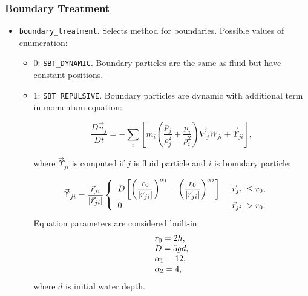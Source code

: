 \subsubsection{Boundary Treatment}
\begin{itemize}
    \item \verb|boundary_treatment|. Selects method for boundaries. Possible values of enumeration:
    \begin{itemize}
        \item 0: \verb|SBT_DYNAMIC|. Boundary particles are the same as fluid but have constant positions.
        \item 1: \verb|SBT_REPULSIVE|. Boundary particles are dynamic with additional term in momentum equation:
        
        \begin{equation}
        \frac{D\vec{v}_j}{D t} = 
        -\sum\limits_{i} 
        \left[
        m_{i} 
        \left(
        \frac{p_{j}}{\rho_{j}^{2}} + 
        \frac{p_{i}}{\rho_{i}^{2}}
        \right) \vec{\nabla}_{j} W_{ji}
        + \vec{\Upsilon}_{ji}
        \right],
        \end{equation}
        
        where $\vec{\Upsilon}_{ji}$ is computed if $j$ is fluid particle and $i$ is boundary particle:
        
        \begin{equation}
        \vec{\Upsilon}_{ji} = 
        \frac{\vec{r}_{ji}}{|\vec{r}_{ji}|}
        \begin{cases}
          \begin{tabular}{l l}
              $\displaystyle{
              D\left[
              \left(
                \frac{r_{0}}{|\vec{r}_{ji}|}
              \right)^{\alpha_{1}}
              -
              \left(
                \frac{r_{0}}{|\vec{r}_{ji}|}
              \right)^{\alpha_{2}}
              \right]
              }$
              &
              $|\vec{r}_{ji}| \leq r_{0}$, 
              
              \\
              
              0
              &
              $|\vec{r}_{ji}| > r_{0}$.
          \end{tabular}  
        \end{cases} 
        \end{equation}
        Equation parameters are considered built-in:
        \begin{equation}
          \begin{tabular}{l}
            $r_{0} = 2h$,
            \\
            $D = 5gd$,
            \\
            $\alpha_{1} = 12$,
            \\
            $\alpha_{2} = 4$,
          \end{tabular}  
        \end{equation}
        where $d$ is initial water depth.
    \end{itemize}
\end{itemize}

